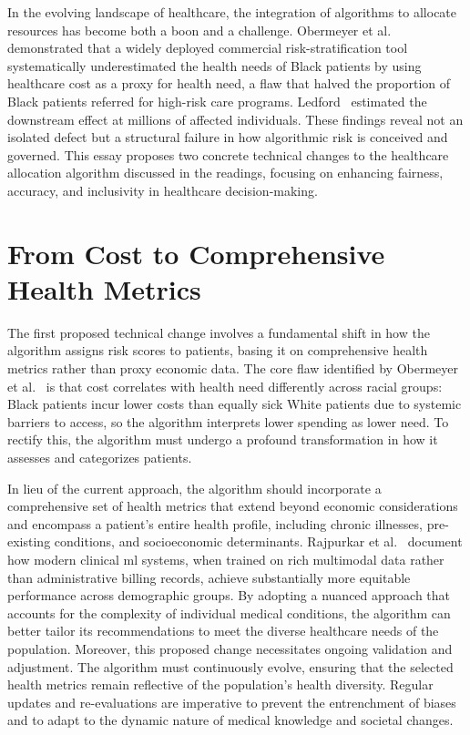 \documentclass[11pt,showkeys]{essay}
\begin{document}
In the evolving landscape of healthcare, the integration of algorithms to allocate resources has become both a boon and a challenge. Obermeyer et al.~\cite{obermeyer_dissecting_2019} demonstrated that a widely deployed commercial risk-stratification tool systematically underestimated the health needs of Black patients by using healthcare cost as a proxy for health need, a flaw that halved the proportion of Black patients referred for high-risk care programs. Ledford~\cite{ledford_millions_2019} estimated the downstream effect at millions of affected individuals. These findings reveal not an isolated defect but a structural failure in how algorithmic risk is conceived and governed. This essay proposes two concrete technical changes to the healthcare allocation algorithm discussed in the readings, focusing on enhancing fairness, accuracy, and inclusivity in healthcare decision-making.

\section{From Cost to Comprehensive Health Metrics}

The first proposed technical change involves a fundamental shift in how the algorithm assigns risk scores to patients, basing it on comprehensive health metrics rather than proxy economic data. The core flaw identified by Obermeyer et al.~\cite{obermeyer_dissecting_2019} is that cost correlates with health need differently across racial groups: Black patients incur lower costs than equally sick White patients due to systemic barriers to access, so the algorithm interprets lower spending as lower need. To rectify this, the algorithm must undergo a profound transformation in how it assesses and categorizes patients.

In lieu of the current approach, the algorithm should incorporate a comprehensive set of health metrics that extend beyond economic considerations and encompass a patient's entire health profile, including chronic illnesses, pre-existing conditions, and socioeconomic determinants. Rajpurkar et al.~\cite{rajpurkar_ai_2022} document how modern clinical \gls{ml} systems, when trained on rich multimodal data rather than administrative billing records, achieve substantially more equitable performance across demographic groups. By adopting a nuanced approach that accounts for the complexity of individual medical conditions, the algorithm can better tailor its recommendations to meet the diverse healthcare needs of the population. Moreover, this proposed change necessitates ongoing validation and adjustment. The algorithm must continuously evolve, ensuring that the selected health metrics remain reflective of the population's health diversity. Regular updates and re-evaluations are imperative to prevent the entrenchment of biases and to adapt to the dynamic nature of medical knowledge and societal changes.
\end{document}
